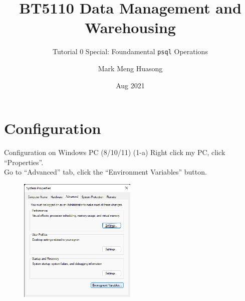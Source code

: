 \title{BT5110 Data Management and Warehousing}

\subtitle{Tutorial 0 Special: Foundamental \texttt{psql} Operations}

\author{Mark Meng Huasong}



\date{Aug 2021}

\begin{frame}
	\titlepage
\end{frame}

\section*{Configuration}

\begin{frame}[fragile]{Configuration on Windows PC (8/10/11)}
	(1-a) Right click my PC, click ``Properties''. \\
	Go to ``Advanced'' tab, click the ``Environment Variables'' button.
	\begin{figure}
		\includegraphics[width=0.5\textwidth]{t0-psql/images/settings.png}
	\end{figure}
\end{frame}

